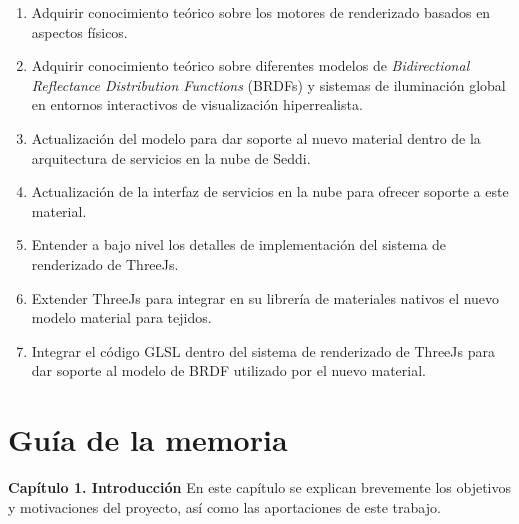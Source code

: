 \begin{enumerate}[label=\arabic*)]
	\item Adquirir conocimiento te\'orico sobre los motores de renderizado basados en aspectos f\'isicos.
    \item Adquirir conocimiento te\'orico sobre diferentes modelos de \textit{Bidirectional}\\
    \textit{Reflectance Distribution Functions} (BRDFs)
    y sistemas de iluminaci\'on global en entornos interactivos de visualizaci\'on hiperrealista.
    \item Actualizaci\'on del modelo para dar soporte al nuevo material dentro de la arquitectura de servicios en
    la nube de Seddi.
	\item Actualizaci\'on de la interfaz de servicios en la nube para ofrecer soporte a este material.
	\item Entender a bajo nivel los detalles de implementaci\'on del sistema de renderizado de ThreeJs.
	\item Extender ThreeJs para integrar en su librer\'ia de materiales nativos el nuevo modelo material para tejidos.
	\item Integrar el c\'odigo GLSL dentro del sistema de renderizado de ThreeJs para dar soporte al modelo de BRDF
	utilizado por el nuevo material.
\end{enumerate}


\section{Gu\'ia de la memoria}

\textbf{Cap\'itulo 1. Introducci\'on}
En este cap\'itulo se explican brevemente los objetivos y motivaciones del proyecto, as\'i como las aportaciones
de este trabajo.\\

